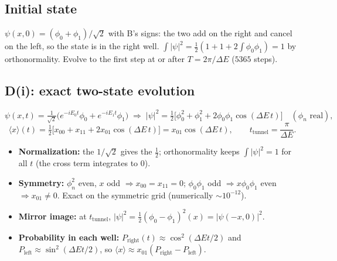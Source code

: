 \documentclass[10pt]{article}
\begin{document}
\subsection{Initial state}
$\psi(x,0)=(\phi_0+\phi_1)/\sqrt2$ with B's signs: the two add on the right and cancel on the left, so the state is in the right well. $\int|\psi|^2=\tfrac12(1+1+2\int\phi_0\phi_1)=1$ by orthonormality. Evolve to the first step at or after $T=2\pi/\Delta E$ ($5365$ steps).

\subsection{D(i): exact two-state evolution}
\[
\psi(x,t)=\tfrac1{\sqrt2}\big(e^{-iE_0t}\phi_0+e^{-iE_1t}\phi_1\big)
\;\Rightarrow\;
|\psi|^2=\tfrac12\big[\phi_0^2+\phi_1^2+2\phi_0\phi_1\cos(\Delta E\,t)\big]\quad(\phi_n\text{ real}),
\]
\[
\langle x\rangle(t)=\tfrac12\big[x_{00}+x_{11}+2x_{01}\cos(\Delta E\,t)\big]=\boxed{x_{01}\cos(\Delta E\,t)},\qquad t_\text{tunnel}=\frac{\pi}{\Delta E}.
\]
\begin{itemize}
\item \textbf{Normalization:} the $1/\sqrt2$ gives the $\tfrac12$; orthonormality keeps $\int|\psi|^2=1$ for all $t$ (the cross term integrates to $0$).
\item \textbf{Symmetry:} $\phi_n^2$ even, $x$ odd $\Rightarrow x_{00}=x_{11}=0$; $\phi_0\phi_1$ odd $\Rightarrow x\phi_0\phi_1$ even $\Rightarrow x_{01}\ne0$. Exact on the symmetric grid (numerically $\sim10^{-12}$).
\item \textbf{Mirror image:} at $t_\text{tunnel}$, $|\psi|^2=\tfrac12(\phi_0-\phi_1)^2(x)=|\psi(-x,0)|^2$.
\item \textbf{Probability in each well:} $P_\text{right}(t)\approx\cos^2(\Delta Et/2)$ and $P_\text{left}\approx\sin^2(\Delta Et/2)$, so $\langle x\rangle\approx x_{01}(P_\text{right}-P_\text{left})$.
\end{itemize}
\end{document}

